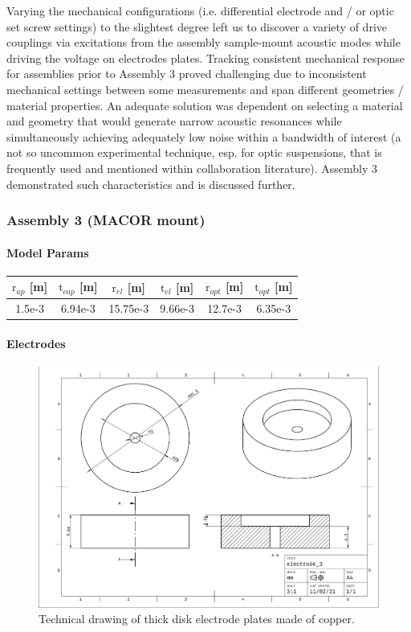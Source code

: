 Varying the mechanical configurations (i.e. differential electrode and / or optic set screw settings) to the slightest degree left us to discover a variety of drive couplings via excitations from the assembly sample-mount acoustic modes while driving the voltage on electrodes plates. Tracking consistent mechanical response for assemblies prior to Assembly 3 proved challenging due to inconsistent mechanical settings between some measurements and span different geometries / material properties. An adequate solution was dependent on selecting a material and geometry that would generate narrow acoustic resonances while simultaneously achieving adequately low noise within a bandwidth of interest (a not so uncommon experimental technique, esp. for optic suspensions, that is frequently used and mentioned within collaboration literature). Assembly 3 demonstrated such characteristics and is discussed further.
\newpage
\subsubsection{Assembly 3 (MACOR mount)}

\paragraph*{Model Params}\label{table:macor_mount}
\begin{center}
\begin{tabular}{ |c|c|c|c|c|c| } 
\hline
$\mathrm{r}_{ap}$ [m] &  $\mathrm{t}_{cap}$ [m] & $\mathrm{r}_{el}$ [m] & $\mathrm{t}_{el}$ [m] & $\mathrm{r}_{opt}$ [m] & $\mathrm{t}_{opt}$ [m] \\
\hline
1.5e-3 & 6.94e-3 & 15.75e-3 & 9.66e-3 & 12.7e-3 & 6.35e-3 \\ 
\hline
\end{tabular}
\end{center}

\paragraph*{Electrodes}
\begin{figure}[H]
  \centering
  \includegraphics[width=.6\textwidth]{figs/ALGAAS/assemblies/assembly3/electrode_3.pdf}
  \caption{Technical drawing of thick disk electrode plates made of copper.}
\end{figure}

